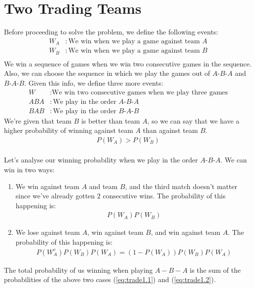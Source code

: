 \section{Two Trading Teams}
Before proceeding to solve the problem, we define the following events:
\begin{align*}
	W_A & : \text{We win when we play a game against team }A \\
	W_B & : \text{We win when we play a game against team }B \\
\end{align*}
We win a sequence of games when we win two consecutive games in the sequence. Also, we can choose the sequence in which we play the games out of $A$-$B$-$A$ and $B$-$A$-$B$.
Given this info, we define three more events:
\begin{align*}
	W   & : \text{We win two consecutive games when we play three games} \\
	ABA & : \text{We play in the order $A$-$B$-$A$}                      \\
	BAB & : \text{We play in the order $B$-$A$-$B$}
\end{align*}
We're given that team $B$ is better than team $A$, so we can say that we have a higher probability of winning against team $A$ than against team $B$.
\begin{align}\label{eq:trade1}
	P(W_A) > P(W_B)
\end{align}
\\Let's analyse our winning probability when we play in the order $A$-$B$-$A$. We can win in two ways:
\begin{enumerate}
	\item We win against team $A$ and team $B$, and the third match doesn't matter since we've already gotten $2$ consecutive wins.
	      The probability of this happening is:
	      \begin{align}\label{eq:trade1.1}
		      P(W_A)P(W_B)
	      \end{align}
	\item We lose against team $A$, win against team $B$, and win against team $A$. The probability of this happening is:
	      \begin{align}\label{eq:trade1.2}
		      P(W_A^c)P(W_B)P(W_A) = (1-P(W_A))P(W_B)P(W_A)
	      \end{align}
\end{enumerate}
The total probability of us winning when playing $A-B-A$ is the sum of the probabilities of the above two cases (\ref{eq:trade1.1}) and (\ref{eq:trade1.2}).

